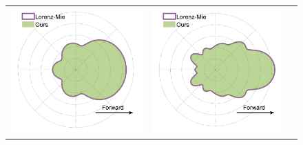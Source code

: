 \begin{figure}
    \centering
    \setlength{\resLen}{1.15in}
    \addtolength{\tabcolsep}{-6pt}
    \begin{tabular}{ccc}
        \includegraphics[width=\resLen]{images/pfunc/mie_300nm.png} & 
        \includegraphics[width=\resLen]{images/pfunc/mie_600nm.png} &  

\end{tabular}
\end{figure}

